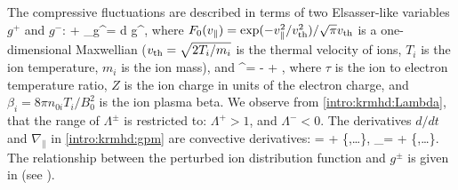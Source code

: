     The compressive fluctuations are described in terms of two Elsasser-like variables
    $g^+$ and $g^-$:
    \beq
     + \vpar \nabla_\parallel g^\pm  = 
    \cdot\nabla \int d \vpar g^\pm, \label{intro:krmhd:gpm}
    \eeq
    where $F_0(v_\parallel)=\exp(-v_\parallel^2/v_{\rm th}^2)/\sqrt{\pi} v_{\rm th}$ is a one-dimensional
    Maxwellian ($v_{\rm th}=\sqrt{2T_i/m_i}$ is the thermal velocity of ions, $T_i$ is the ion
    temperature, $m_i$ is the ion mass), and
    \beq
        \Lambda^\pm = - +  \pm {}, \label{intro:krmhd:Lambda}
    \eeq
    where $\tau$ is the ion to electron temperature ratio, $Z$ is the ion charge in units
    of the electron charge, and $\beta_i = 8\pi n_{0i} T_i/B_0^2$ is the ion plasma beta.
    We observe from \eqref{intro:krmhd:Lambda}, that the range of $\Lambda^\pm$ is
    restricted to: $\Lambda^+ > 1$, and $\Lambda^- < 0$. The derivatives $d/dt$ 
    and $\nabla_\parallel$ in \eqref{intro:krmhd:gpm} are convective derivatives:
    \beq
         =  + \lt\{\Phi,\ldots\rt\}, \quad \nabla_\parallel =
         + \lt\{\Psi,\ldots\rt\}.\label{intro:krmhd:convder}
    \eeq
    The relationship between
    the perturbed ion distribution function and $g^\pm$ is given in  (see
    ).

